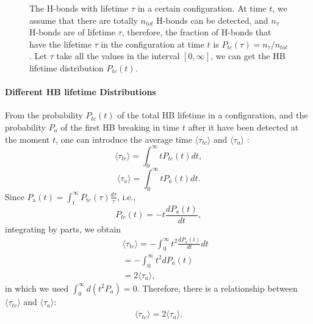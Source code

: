 {\begin{figure}
  \caption{\label{fig:P_tc} The H-bonds with lifetime $\tau$ in a certain configuration. 
At time $t$, we assume that there are totally $n_{tot}$ H-bonds can be detected, and $n_{\tau}$ H-bonds are of lifetime $\tau$, therefore,  the fraction of H-bonds that 
have the lifetime $\tau$ in the configuration at time $t$ is $P_{tc}(\tau) =  n_{\tau} /n_{tot}$.
Let $\tau$ take all the values in the interval $[0,\infty]$, we can get the HB lifetime distribution $P_{tc}(t)$.
}
\end{figure}
\paragraph{Different HB lifetime Distributions}\label{diff_distr}
From the probability $P_{tc}(t)$ of the total HB lifetime in a configuration, and the probability $P_{a}$ of 
the first HB breaking in time $t$ after it have been detected at the moment $t$, one can introduce the average time 
$\langle \tau_{tc}\rangle$ and $\langle \tau_{a}\rangle$ :
\begin{equation}
\langle \tau_{tc}\rangle = \int_0^\infty t P_{tc}(t) dt,
\label{eq:tau_tc}
\end{equation}
\begin{equation}
\langle \tau_{a}\rangle = \int_0^\infty t P_a(t) dt. 
\label{eq:tau_a}
\end{equation}
Since $P_{\mathrm{a}}(t)=\int_{t}^{\infty} P_{\mathrm{tc}}(\tau) \frac{d \tau}{\tau}$, i.e., 
\begin{equation}
P_{tc}(t) = -t\frac{dP_a(t)}{dt}, \nonumber
\label{eq:relation_Ptc--Pa}
\end{equation}
integrating by parts, we obtain
\begin{eqnarray}
&&\langle \tau_{tc}\rangle = -\int_0^\infty t^2 \frac{dP_a(t)}{dt}dt \nonumber \\
&&= -\int_0^\infty t^2 dP_a(t) \nonumber\\
&&= 2\langle \tau_{a}\rangle,\nonumber
\end{eqnarray}
in which we used $\int_0^\infty d(t^2 P_a)=0$.
Therefore, there is a relationship between $\langle \tau_{tc} \rangle$ and $\langle \tau_a \rangle$:
\begin{eqnarray}
\langle \tau_{tc}\rangle = 2\langle \tau_{a}\rangle.
\label{eq:relation_tau_tc--t_a}
\end{eqnarray}

}
